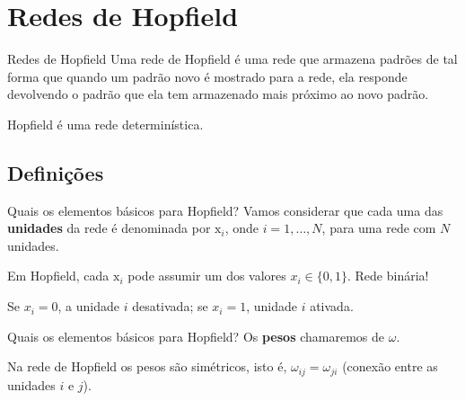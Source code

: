 \section{Redes de Hopfield}

\begin{frame}{Redes de Hopfield}%
  \justifying%
  Uma rede de Hopfield é uma rede que armazena padrões de tal forma que quando um padrão novo é mostrado para a rede, ela responde devolvendo o padrão que ela tem armazenado mais próximo ao novo padrão.

  Hopfield é uma rede determinística.
\end{frame}

\subsection{Definições}
\begin{frame}{Quais os elementos básicos para Hopfield?}%
  \justifying%
  Vamos considerar que cada uma das \textbf{unidades} da rede é denominada por $\mathrm{x}_{i}$, onde $i = 1, \dots, N$, para uma rede com $N$ unidades.
  
  Em Hopfield, cada $\mathrm{x}_{i}$ pode assumir um dos valores $x_{i} \in \{0, 1\}$. Rede binária!

  Se $x_{i} = 0$, a unidade $i$ desativada; se $x_{i} = 1$, unidade $i$ ativada.
\end{frame}

\begin{frame}{Quais os elementos básicos para Hopfield?}%
  \justifying%
  Os \textbf{pesos} chamaremos de $\omega$.
  
  Na rede de Hopfield os pesos são simétricos, isto é, $\omega_{ij} = \omega_{ji}$ (conexão entre as unidades $i$ e $j$).
  
\end{frame}

